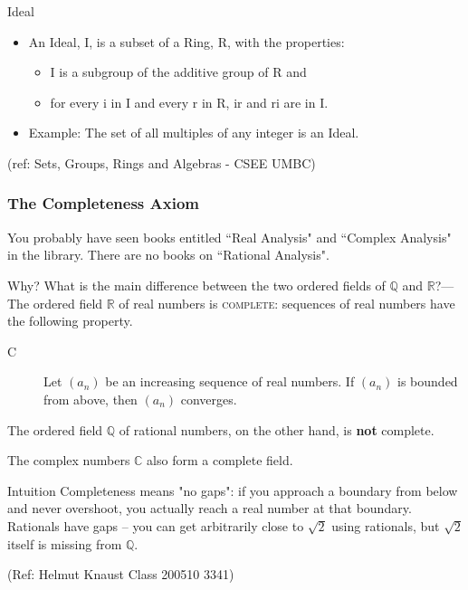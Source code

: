 \begin{frame}{Ideal}

\begin{itemize}
\item  An Ideal, I, is a subset of a Ring, R, with the properties:
\begin{itemize}
\item I is a subgroup of the additive group of R and
\item for every i in I and every r in R, ir and ri are in I.
\end{itemize}
\item   Example: The set of all multiples of any integer is an Ideal.

\end{itemize}


\tiny{(ref: Sets, Groups, Rings and Algebras - CSEE UMBC)}

\end{frame}


 \begin{frame}[fragile]\frametitle{The Completeness Axiom}

You probably have seen books entitled ``Real Analysis" and
``Complex Analysis" in the library. There are no books on
``Rational Analysis".

Why? What is the main difference between the two ordered fields of
${\mathbb Q}$ and ${\mathbb R}$?---The ordered field ${\mathbb R}$ of real numbers
is \textsc{complete}: sequences of real numbers have the following
property.

\begin{description}
\item[C] Let $(a_n)$ be an  increasing sequence of real numbers.
If $(a_n)$ is bounded from above, then $(a_n)$ converges.
\end{description}

The ordered field ${\mathbb Q}$ of rational numbers, on the other hand,
is \textbf{not} complete.

The complex numbers ${\mathbb C}$ also form a complete field.

\begin{block}{Intuition}
Completeness means "no gaps": if you approach a boundary from below and never overshoot, you actually reach a real number at that boundary. Rationals have gaps -- you can get arbitrarily close to $\sqrt{2}$ using rationals, but $\sqrt{2}$ itself is missing from $\mathbb{Q}$.
\end{block}

\tiny{(Ref: Helmut Knaust Class 200510 3341)}

\end{frame}

